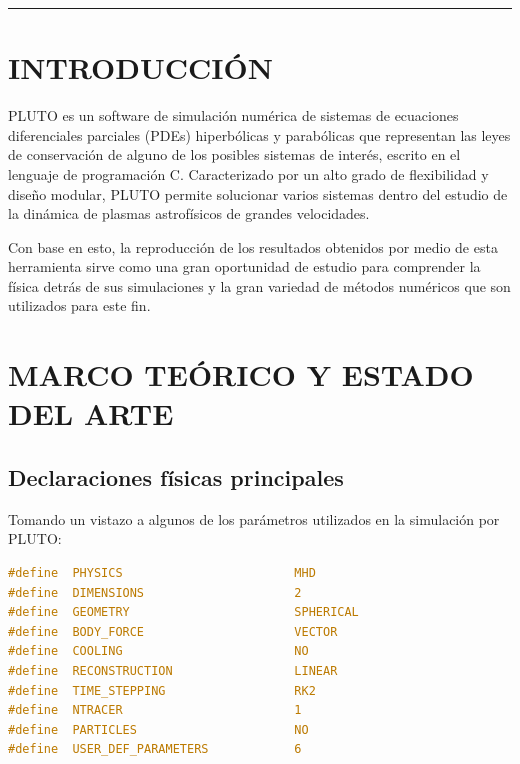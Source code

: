 \documentclass[11pt, letterpaper]{article}
\begin{document}
\vspace{0.3em}
\noindent\rule{\linewidth}{0.4pt}
\vspace{0.6em}


\section{INTRODUCCIÓN}

PLUTO es un software de simulación numérica de sistemas de ecuaciones diferenciales parciales (PDEs) hiperbólicas y parabólicas que representan las leyes de conservación de alguno de los posibles sistemas de interés, escrito en el lenguaje de programación C. Caracterizado por un alto grado de flexibilidad y diseño modular, PLUTO permite solucionar varios sistemas dentro del estudio de la dinámica de plasmas astrofísicos de grandes velocidades.

\medskip

Con base en esto, la reproducción de los resultados obtenidos por medio de esta herramienta sirve como una gran oportunidad de estudio para comprender la física detrás de sus simulaciones y la gran variedad de métodos numéricos que son utilizados para este fin.

\section{MARCO TEÓRICO Y ESTADO DEL ARTE}

\subsection{Declaraciones físicas principales}

Tomando un vistazo a algunos de los parámetros utilizados en la simulación por PLUTO:

\begin{lstlisting}[language=C, caption={Parámetros físicos principales (definitions\_03.h)}, label={cod:definitions_Physics1}]
#define  PHYSICS                        MHD
#define  DIMENSIONS                     2
#define  GEOMETRY                       SPHERICAL
#define  BODY_FORCE                     VECTOR
#define  COOLING                        NO
#define  RECONSTRUCTION                 LINEAR
#define  TIME_STEPPING                  RK2
#define  NTRACER                        1
#define  PARTICLES                      NO
#define  USER_DEF_PARAMETERS            6
\end{lstlisting}
\end{document}
